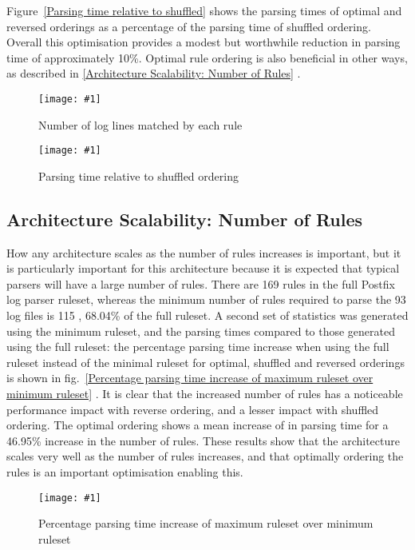 \documentclass{svmult}
\newcommand{\showgraph}[3]{%
    \begin{figure}[btp]%
        \texttt{[image: \#1]}%
        \caption{#2}\label{#3}%
    \end{figure}%
}
\newcommand{\sectionref}[1]{%
    \textsection{}\vref*{#1}%
}
\newcommand{\refwithlabel}[2]{%
    #1~\vref{#2}%
}
\newcommand{\graphref}[1]{%
    \refwithlabel{fig.}{#1}%
}
\newcommand{\Graphref}[1]{%
    \refwithlabel{Figure}{#1}%
}
\newcommand{\numberOFlogFILES}[0]{%
    93%
}
\newcommand{\numberOFrules}[0]{%
    169%
}
\newcommand{\numberOFrulesMINIMUM}[0]{%
    115%
}
\newcommand{\numberOFrulesMINIMUMpercentage}[0]{%
    68.04\%%
}
\newcommand{\numberOFrulesMAXIMUMpercentage}[0]{%
    46.95\%%
}
\begin{document}
\Graphref{Parsing time relative to shuffled} shows the parsing times of
optimal and reversed orderings as a percentage of the parsing time of
shuffled ordering.  Overall this optimisation provides a modest but
worthwhile reduction in parsing time of approximately 10\%.  Optimal rule
ordering is also beneficial in other ways, as described in
\sectionref{Architecture Scalability: Number of Rules}.
\showgraph{build/graph-hits}{Number of log lines matched by each rule}{rule
hits graph} \showgraph{build/graph-optimal-and-reverse-vs-shuffle}{Parsing
time relative to shuffled ordering}{Parsing time relative to shuffled}

\subsection{Architecture Scalability: Number of Rules}

\label{Architecture Scalability: Number of Rules}

How any architecture scales as the number of rules increases is important,
but it is particularly important for this architecture because it is
expected that typical parsers will have a large number of rules.  There are
\numberOFrules{} rules in the full Postfix log parser ruleset, whereas the
minimum number of rules required to parse the \numberOFlogFILES{} log files
is \numberOFrulesMINIMUM{}, \numberOFrulesMINIMUMpercentage{} of the full
ruleset.  A second set of statistics was generated using the minimum
ruleset, and the parsing times compared to those generated using the full
ruleset: the percentage parsing time increase when using the full ruleset
instead of the minimal ruleset for optimal, shuffled and reversed orderings
is shown in \graphref{Percentage parsing time increase of maximum ruleset
over minimum ruleset}.  It is clear that the increased number of rules has
a noticeable performance impact with reverse ordering, and a lesser impact
with shuffled ordering.  The optimal ordering shows a mean increase of
 in parsing time for a
\numberOFrulesMAXIMUMpercentage{} increase in the number of rules.  These
results show that the architecture scales very well as the number of rules
increases, and that optimally ordering the rules is an important
optimisation enabling this.
\showgraph{build/graph-full-ruleset-vs-minimum-ruleset}{Percentage parsing
time increase of maximum ruleset over minimum ruleset}{Percentage parsing
time increase of maximum ruleset over minimum ruleset}
\end{document}

